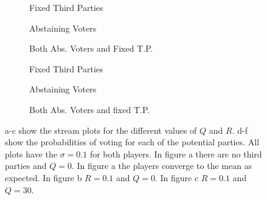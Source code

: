 \documentclass{article}
\begin{document}
         \begin{figure}[htbp]
          \begin{subfigure}[b]{0.3\linewidth}
                \centering
                 
                \caption{Fixed Third Parties} 
                \label{fig9:b} 
                \vspace{4ex}
            \end{subfigure}%
            \begin{subfigure}[b]{0.3\linewidth}
                \centering
                 
                \caption{Abstaining Voters} 
                \label{fig9:c} 
                \vspace{4ex}
            \end{subfigure} 
            \begin{subfigure}[b]{0.3\linewidth}
                \centering
                 
                \caption{Both Abs. Voters and Fixed T.P.} 
                \label{fig9:d}
                \vspace{4ex}
            \end{subfigure}%
            
            
            \begin{subfigure}[b]{0.3\linewidth}
                \centering
                
                \caption{Fixed Third Parties}  
                \label{fig9:e} 
                \vspace{4ex}
            \end{subfigure}
            \begin{subfigure}[b]{0.3\linewidth}
                \centering
                
                \caption{Abstaining Voters} 
                \label{fig9:f} 
                \vspace{4ex}
            \end{subfigure}
            \begin{subfigure}[b]{0.3\linewidth}
                \centering
                
                \caption{Both Abs. Voters and fixed T.P.} 
                \label{fig9:g}
                \vspace{4ex}
            \end{subfigure} 
        \caption{a-c show the stream plots for the different values of $Q$ and $R$. d-f show the probabilities of voting for each of the potential parties. All plots have the $\sigma= 0.1$ for both players. In figure a there are no third parties and $Q=0$. In figure a the players converge to the mean as expected. In figure b $R=0.1$ and $Q=0$. In figure c $R=0.1$ and $Q=30$.}\label{fig9}
        \end{figure}
\end{document}
